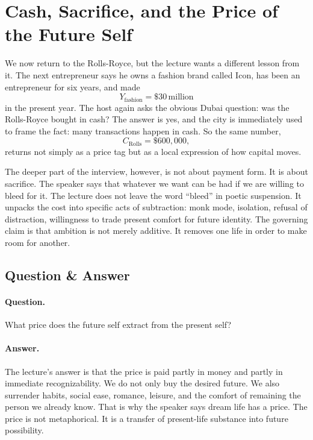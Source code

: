 \section{Cash, Sacrifice, and the Price of the Future Self}

We now return to the Rolls-Royce, but the lecture wants a different lesson from it. The next entrepreneur says he owns a fashion brand called Icon, has been an entrepreneur for six years, and made
\begin{equation}
Y_{\text{fashion}}=\$30\,\text{million}
\end{equation}
in the present year. The host again asks the obvious Dubai question: was the Rolls-Royce bought in cash? The answer is yes, and the city is immediately used to frame the fact: many transactions happen in cash. So the same number,
\begin{equation}
C_{\text{Rolls}}=\$600{,}000,
\end{equation}
returns not simply as a price tag but as a local expression of how capital moves.

The deeper part of the interview, however, is not about payment form. It is about sacrifice. The speaker says that whatever we want can be had if we are willing to bleed for it. The lecture does not leave the word ``bleed'' in poetic suspension. It unpacks the cost into specific acts of subtraction: monk mode, isolation, refusal of distraction, willingness to trade present comfort for future identity. The governing claim is that ambition is not merely additive. It removes one life in order to make room for another.

\subsection{Question \& Answer}

\paragraph{Question.}
What price does the future self extract from the present self?

\paragraph{Answer.}
The lecture's answer is that the price is paid partly in money and partly in immediate recognizability. We do not only buy the desired future. We also surrender habits, social ease, romance, leisure, and the comfort of remaining the person we already know. That is why the speaker says dream life has a price. The price is not metaphorical. It is a transfer of present-life substance into future possibility.

